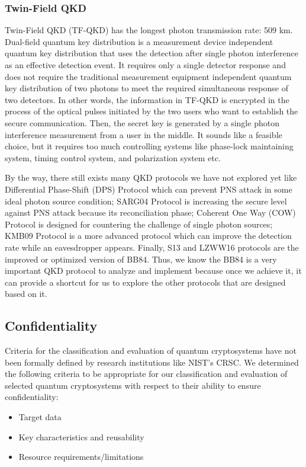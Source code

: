 \documentclass[sigconf]{acmart}
\begin{document}
\subsubsection{Twin-Field QKD} 
Twin-Field QKD (TF-QKD) has the longest photon transmission rate: 509 km. Dual-field quantum key distribution is a measurement device independent quantum key distribution that uses the detection after single photon interference as an effective detection event. It requires only a single detector response and does not require the traditional measurement equipment independent quantum key distribution of two photons to meet the required simultaneous response of two detectors. In other words, the information in TF-QKD is encrypted in the process of the optical pulses initiated by the two users who want to establish the secure communication. Then, the secret key is generated by a single photon interference measurement from a user in the middle. It sounds like a feasible choice, but it requires too much controlling systems like phase-lock maintaining system, timing control system, and polarization system etc.

By the way, there still exists many QKD protocols we have not explored yet like Differential Phase-Shift (DPS) Protocol which can prevent PNS attack in some ideal photon source condition; SARG04 Protocol is increasing the secure level against PNS attack because its reconciliation phase; Coherent One Way (COW) Protocol is designed for countering the challenge of single photon sources; KMB09 Protocol is a more advanced protocol which can improve the detection rate while an eavesdropper appears. Finally, S13 and LZWW16 protocols are the improved or optimized version of BB84. Thus, we know the BB84 is a very important QKD protocol to analyze and implement because once we achieve it, it can provide a shortcut for us to explore the other protocols that are designed based on it\cite{khan_security_2020}. 


\subsection{Confidentiality} %
Criteria for the classification and evaluation of quantum cryptosystems have not been formally defined by research institutions like NIST's CRSC. We determined the following criteria to be appropriate for our classification and evaluation of selected quantum cryptosystems with respect to their ability to ensure confidentiality:
\begin{itemize}
\item Target data
\item Key characteristics and reusability
\item Resource requirements/limitations
\end{itemize}
\end{document}
